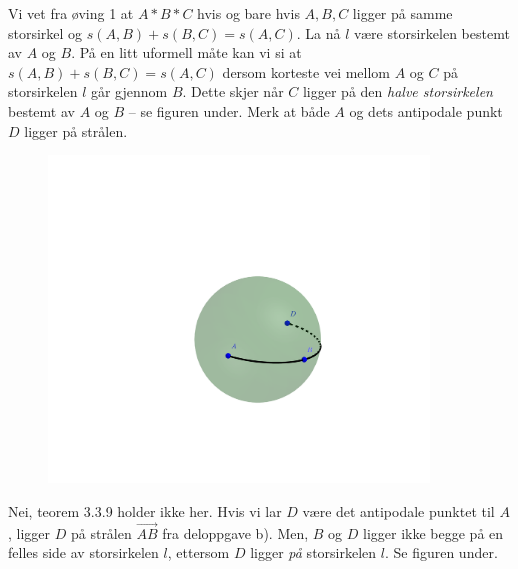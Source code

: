 \begin{oppgave}[3.3.4]
\begin{punkt}
  \end{punkt}

  \begin{punkt}
    Vi vet fra øving 1 at $A\ast B\ast C$ hvis og bare hvis $A, B, C$ ligger på samme storsirkel og 
    $s(A, B)+s(B,C) = s(A,C)$. La nå $l$ være storsirkelen bestemt av $A$ og $B$. På en litt uformell
    måte kan vi si at $s(A, B)+s(B, C) = s(A, C)$ dersom korteste vei mellom $A$ og $C$ på storsirkelen
    $l$ går gjennom $B$. Dette skjer når $C$ ligger på den \emph{halve storsirkelen} bestemt av $A$ og 
    $B$ -- se figuren under. Merk at både $A$ og dets antipodale punkt $D$ ligger på strålen. 

    \begin{figure}[H]
      \centering 
      \includegraphics[trim={13cm 13cm 12cm 22cm},clip, width=0.9\textwidth]{oving_2/334b.png}
    \end{figure}
  \end{punkt}

  \begin{punkt}
    Nei, teorem 3.3.9 holder ikke her. Hvis vi lar $D$ være det antipodale punktet til $A$, ligger $D$
    på strålen $\overrightarrow{AB}$ fra deloppgave b). Men, $B$ og $D$ ligger ikke begge på en felles
    side av storsirkelen $l$, ettersom $D$ ligger \emph{på} storsirkelen $l$. Se figuren under.


\end{punkt}
\end{oppgave}
